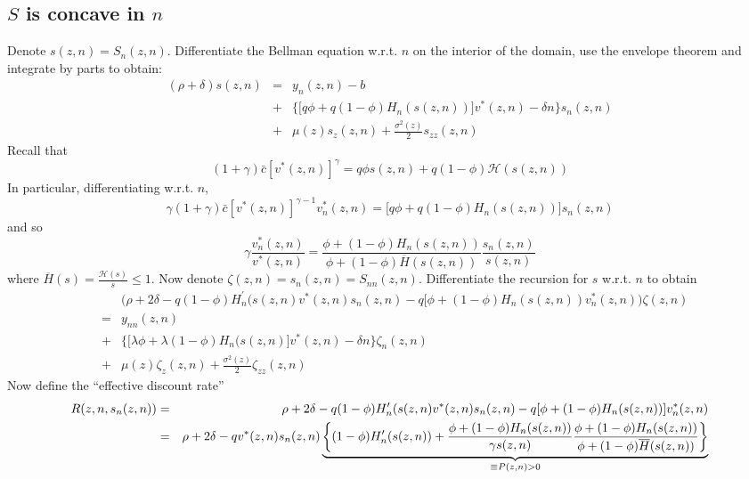 \subsection{$S$ is concave in $n$}

Denote $s(z,n) = S_n(z,n)$. Differentiate the Bellman equation w.r.t. $n$ on
the interior of the domain, use the envelope theorem and integrate by parts
to obtain:
\begin{eqnarray*}
(\rho+\delta) s(z,n) &=& y_n(z,n) - b \\
&+& \Big\{ \big[q \phi + q (1-\phi) H_n(s(z,n)) \big] v^*(z,n) - \delta n\Big\}
s_n(z,n) \\
&+& \mu(z) s_z(z,n) + \frac{\sigma^2(z)}{2} s_{zz}(z,n)
\end{eqnarray*}
Recall that
\begin{equation}
(1+\gamma) \bar{c} [ v^*(z,n) ]^\gamma = q \phi s(z,n) + q(1-\phi) \mathcal{H}%
(s(z,n))\label{appx_v*}
\end{equation}
In particular, differentiating w.r.t. $n$,
\begin{equation*}
\gamma (1+\gamma) \bar{c} [ v^*(z,n) ]^{\gamma-1} v^*_n(z,n) = \big[ q \phi +
q(1-\phi) H_n(s(z,n)) \big] s_n(z,n)
\end{equation*}
and so
\begin{equation*}
\gamma \frac{ v^*_n(z,n)}{v^*(z,n)} = \frac{\phi + (1-\phi) H_n(s(z,n))}{\phi
+ (1-\phi) \overline{H}(s(z,n))} \frac{s_n(z,n)}{s(z,n)}
\end{equation*}
where $\overline{H}(s) = \frac{\mathcal{H}(s)}{s} \leq 1$. Now denote $\zeta(z,n)
= s_n(z,n) = S_{nn}(z,n)$. Differentiate the recursion for $s$ w.r.t. $n$ to
obtain
\begin{eqnarray*}
&& \Bigg(\rho+ 2\delta - q (1-\phi) H_n^{\prime}(s(z,n) v^*(z,n)s_n(z,n) - q[
\phi + (1-\phi) H_n(s(z,n)) v_n^*(z,n) \Bigg) \zeta(z,n) \\
&=& y_{nn}(z,n) \\
&+& \Big\{ \big[\lambda \phi + \lambda (1-\phi) H_n(s(z,n) \big] v^*(z,n)-
\delta n\Big\}\zeta_n(z,n) \\
&+& \mu(z) \zeta_z(z,n) + \frac{\sigma^2(z)}{2} \zeta_{zz}(z,n)
\end{eqnarray*}
Now define the ``effective discount rate''
{\small
\begin{eqnarray*}
R(z,n, s_n(z,n)) &=& \rho+ 2\delta - q (1-\phi) H_n^{\prime}(s(z,n) v^*(z,n)
s_n(z,n) - q[ \phi + (1-\phi) H_n(s(z,n))] v_n^*(z,n) \\
&=& \rho+ 2\delta - q v^*(z,n) s_n(z,n) \underbrace{ \left\{ (1-\phi)
H_n^{\prime}(s(z,n)) + \frac{ \phi + (1-\phi) H_n(s(z,n))}{\gamma s(z,n)}\frac{%
\phi + (1-\phi) H_n(s(z,n))}{\phi + (1-\phi) \overline{H}(s(z,n))} \right\} }%
_{\equiv P(z,n) > 0}
\end{eqnarray*}}
